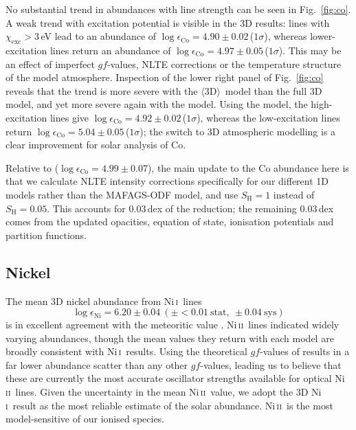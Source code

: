 \documentclass[traditabstract]{aa}
\newcommand{\oneDAV}{$\langle\mathrm{3D}\rangle$}
\newcommand{\altnii}{Ni\,\textsc{i}}
\newcommand{\altniii}{Ni\,\textsc{ii}}
\newcommand{\nii}{\altnii\ }
\newcommand{\niii}{\altniii\ }
\begin{document}
No substantial trend in abundances with line strength can be seen in Fig.~\ref{fig:co}.  A weak trend with excitation potential is visible in the 3D results: lines with $\chi_\mathrm{exc}>3$\,eV lead to an abundance of $\log \epsilon_\mathrm{Co}=4.90\pm0.02$\,($1\sigma$), whereas lower-excitation lines return an abundance of $\log \epsilon_\mathrm{Co}=4.97\pm0.05$\,($1\sigma$).  This may be an effect of imperfect $gf$-values, NLTE corrections or the temperature structure of the model atmosphere.  Inspection of the lower right panel of Fig.~\ref{fig:co} reveals that the trend is more severe with the \oneDAV\ model than the full 3D model, and yet more severe again with the  model.  Using the  model, the high-excitation lines give $\log \epsilon_\mathrm{Co}=4.92\pm0.02$\,($1\sigma$), whereas the low-excitation lines return $\log \epsilon_\mathrm{Co}=5.04\pm0.05$\,($1\sigma$); the switch to 3D atmospheric modelling is a clear improvement for solar analysis of Co.

Relative to  ($\log \epsilon_\mathrm{Co}=4.99\pm0.07$), the main update to the Co abundance here is that we calculate NLTE intensity corrections \citep[based on][]{Bergemann10Co} specifically for our different 1D models rather than the MAFAGS-ODF model, and use $S_\mathrm{H}=1$ instead of $S_\mathrm{H}=0.05$.  This accounts for $0.03$\,dex of the reduction; the remaining $0.03$\,dex comes from the updated opacities, equation of state, ionisation potentials and partition functions.

\subsection{Nickel}
\label{Niresults}

The mean 3D nickel abundance from \nii lines
\begin{displaymath}
\log \epsilon_\mathrm{Ni}=6.20\pm0.04\ (\pm\!<\!0.01\ \mathrm{stat},\ \pm0.04\ \mathrm{sys})
\end{displaymath}
is in excellent agreement with the meteoritic value \citep[$6.20\pm0.01$;][]{Lodders09}.  \niii lines indicated widely varying abundances, though the mean values they return with each model are broadly consistent with \nii results.  Using the theoretical $gf$-values of \citet{Fritzsche00} results in a far lower abundance scatter than any other $gf$-values, leading us to believe that these are currently the most accurate oscillator strengths available for optical \niii lines.  Given the uncertainty in the mean \niii value, we adopt the 3D \nii result as the most reliable estimate of the solar abundance.  \niii is the most model-sensitive of our ionised species. 
\end{document}
